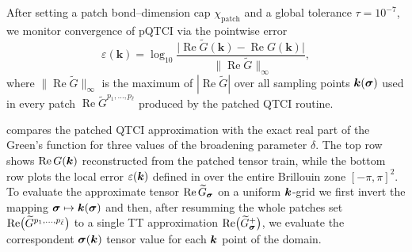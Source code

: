 After setting a patch bond–dimension cap \(\chi_{\text{patch}}\) and a global tolerance \(\tau=10^{-7}\), we monitor convergence of pQTCI via the pointwise error
\begin{equation}
  \varepsilon(\mathbf{k})
  = \log_{10}\!
      \frac{\bigl|\operatorname{Re}\widetilde G(\mathbf{k})
                -\operatorname{Re}G(\mathbf{k})\bigr|}
           {\;\|\operatorname{Re}\widetilde G\|_{\infty}},
  \label{eq:localError2DGreen}
\end{equation}
where \(\|\operatorname{Re}\widetilde G\|_{\infty}\) is the maximum of \(|\operatorname{Re}\widetilde G|\) over all sampling points \(\boldsymbol{k}(\boldsymbol{\sigma})\) used in every patch \(\operatorname{Re} \widetilde{G}^{p_1,\dots,p_{\bar\ell}}\) produced by the patched QTCI routine.

 compares the patched QTCI approximation with the exact real part of the Green’s function for three values of the
broadening parameter \(\delta\).  The top row shows
\(\operatorname{Re}G(\boldsymbol{k})\) reconstructed from the patched tensor train, while the bottom row plots the local error \(\varepsilon(\boldsymbol{k})\) defined in  over the entire Brillouin zone \([-\pi,\pi]^{2}\). To evaluate the approximate tensor
\(\operatorname{Re}\widetilde{G}_{\boldsymbol{\sigma}}\) on a uniform \(\boldsymbol{k}\)-grid we first invert the mapping \(\boldsymbol{\sigma}\mapsto\boldsymbol{k}(\boldsymbol{\sigma})\) and then, after resumming the whole patches set $\text{Re}\bigl(\widetilde{G}^{p_1,\dots,p_{{\bar \ell}}}\bigr)$ to a single TT approximation $\text{Re}\bigl(\widetilde{G}_{\boldsymbol{\sigma}}^{+}\bigr)$, we evaluate the correspondent $\boldsymbol{\sigma}(\boldsymbol{k})$ tensor value for each $\boldsymbol{k}$ point of the domain. 

